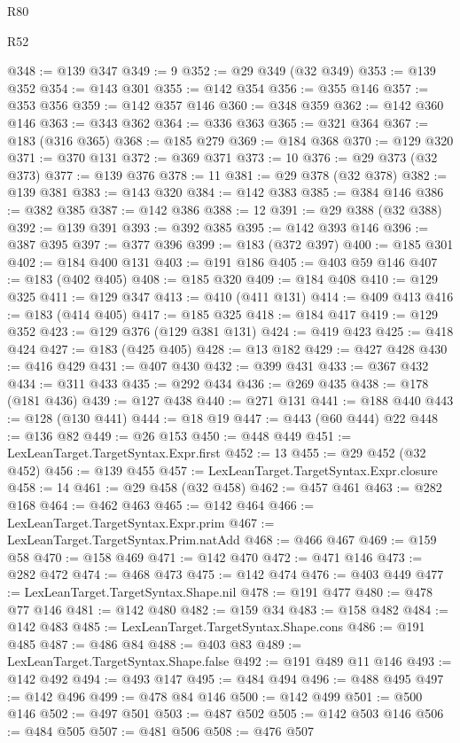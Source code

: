 \begin{lexlean}{R80}
\begin{lexlean}{R52}
\begin{coremodule}
{{{{{{{{{{{{{{{{{{{{{{{{{{{{{{{{{{{{{{{{{{{{{{{{{{{{{{{{{{{{{{{{{{{{{{{{{{{{{{{{{{{{{{{{{{{{{{{{{{{{{{{{{{{{{{{{{{{{{{{{{{{{{{{{{{{{{{{{{{{{{{{{{{{{{{{{{{{{{{{{{{{{{{{{{{{{{{{{{{{{{{{{{{{{{{{{{{{{{{@348 := @139 @347
@349 := 9
@352 := @29 @349 (@32 @349)
@353 := @139 @352
@354 := @143 @301
@355 := @142 @354
@356 := @355 @146
@357 := @353 @356
@359 := @142 @357 @146
@360 := @348 @359
@362 := @142 @360 @146
@363 := @343 @362
@364 := @336 @363
@365 := @321 @364
@367 := @183 (@316 @365)
@368 := @185 @279
@369 := @184 @368
@370 := @129 @320
@371 := @370 @131
@372 := @369 @371
@373 := 10
@376 := @29 @373 (@32 @373)
@377 := @139 @376
@378 := 11
@381 := @29 @378 (@32 @378)
@382 := @139 @381
@383 := @143 @320
@384 := @142 @383
@385 := @384 @146
@386 := @382 @385
@387 := @142 @386
@388 := 12
@391 := @29 @388 (@32 @388)
@392 := @139 @391
@393 := @392 @385
@395 := @142 @393 @146
@396 := @387 @395
@397 := @377 @396
@399 := @183 (@372 @397)
@400 := @185 @301
@402 := @184 @400 @131
@403 := @191 @186
@405 := @403 @59 @146
@407 := @183 (@402 @405)
@408 := @185 @320
@409 := @184 @408
@410 := @129 @325
@411 := @129 @347
@413 := @410 (@411 @131)
@414 := @409 @413
@416 := @183 (@414 @405)
@417 := @185 @325
@418 := @184 @417
@419 := @129 @352
@423 := @129 @376 (@129 @381 @131)
@424 := @419 @423
@425 := @418 @424
@427 := @183 (@425 @405)
@428 := @13 @182
@429 := @427 @428
@430 := @416 @429
@431 := @407 @430
@432 := @399 @431
@433 := @367 @432
@434 := @311 @433
@435 := @292 @434
@436 := @269 @435
@438 := @178 (@181 @436)
@439 := @127 @438
@440 := @271 @131
@441 := @188 @440
@443 := @128 (@130 @441)
@444 := @18 @19
@447 := @443 (@60 @444) @22
@448 := @136 @82
@449 := @26 @153
@450 := @448 @449
@451 := LexLeanTarget.TargetSyntax.Expr.first
@452 := 13
@455 := @29 @452 (@32 @452)
@456 := @139 @455
@457 := LexLeanTarget.TargetSyntax.Expr.closure
@458 := 14
@461 := @29 @458 (@32 @458)
@462 := @457 @461
@463 := @282 @168
@464 := @462 @463
@465 := @142 @464
@466 := LexLeanTarget.TargetSyntax.Expr.prim
@467 := LexLeanTarget.TargetSyntax.Prim.natAdd
@468 := @466 @467
@469 := @159 @58
@470 := @158 @469
@471 := @142 @470
@472 := @471 @146
@473 := @282 @472
@474 := @468 @473
@475 := @142 @474
@476 := @403 @449
@477 := LexLeanTarget.TargetSyntax.Shape.nil
@478 := @191 @477
@480 := @478 @77 @146
@481 := @142 @480
@482 := @159 @34
@483 := @158 @482
@484 := @142 @483
@485 := LexLeanTarget.TargetSyntax.Shape.cons
@486 := @191 @485
@487 := @486 @84
@488 := @403 @83
@489 := LexLeanTarget.TargetSyntax.Shape.false
@492 := @191 @489 @11 @146
@493 := @142 @492
@494 := @493 @147
@495 := @484 @494
@496 := @488 @495
@497 := @142 @496
@499 := @478 @84 @146
@500 := @142 @499
@501 := @500 @146
@502 := @497 @501
@503 := @487 @502
@505 := @142 @503 @146
@506 := @484 @505
@507 := @481 @506
@508 := @476 @507
}}}}}}}}}}}}}}}}}}}}}}}}}}}}}}}}}}}}}}}}}}}}}}}}}}}}}}}}}}}}}}}}}}}}}}}}}}}}}}}}}}}}}}}}}}}}}}}}}}}}}}}}}}}}}}}}}}}}}}}}}}}}}}}}}}}}}}}}}}}}}}}}}}}}}}}}}}}}}}}}}}}}}}}}}}}}}}}}}}}}}}}}}}}}}}}}}}}}}}
\end{coremodule}
\end{lexlean}
\end{lexlean}

